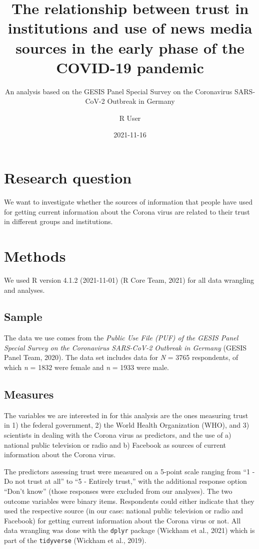 \documentclass[
]{article}
\title{The relationship between trust in institutions and use of news
media sources in the early phase of the COVID-19 pandemic}
\subtitle{An analysis based on the GESIS Panel Special Survey on the
Coronavirus SARS-CoV-2 Outbreak in Germany}
\author{R User}
\date{2021-11-16}
\begin{document}
\maketitle

\hypertarget{research-question}{%
\section{Research question}\label{research-question}}

We want to investigate whether the sources of information that people
have used for getting current information about the Corona virus are
related to their trust in different groups and institutions.

\hypertarget{methods}{%
\section{Methods}\label{methods}}

We used R version 4.1.2 (2021-11-01) (R Core Team, 2021) for all data
wrangling and analyses.

\hypertarget{sample}{%
\subsection{Sample}\label{sample}}

The data we use comes from the \emph{Public Use File (PUF) of the GESIS
Panel Special Survey on the Coronavirus SARS-CoV-2 Outbreak in Germany}
(GESIS Panel Team, 2020). The data set includes data for \emph{N} = 3765
respondents, of which \emph{n} = 1832 were female and \emph{n} = 1933
were male.

\hypertarget{measures}{%
\subsection{Measures}\label{measures}}

The variables we are interested in for this analysis are the ones
measuring trust in 1) the federal government, 2) the World Health
Organization (WHO), and 3) scientists in dealing with the Corona virus
as predictors, and the use of a) national public television or radio and
b) Facebook as sources of current information about the Corona virus.

The predictors assessing trust were measured on a 5-point scale ranging
from ``1 - Do not trust at all'' to ``5 - Entirely trust,'' with the
additional response option ``Don't know'' (those responses were excluded
from our analyses). The two outcome variables were binary items.
Respondents could either indicate that they used the respective source
(in our case: national public television or radio and Facebook) for
getting current information about the Corona virus or not. All data
wrangling was done with the \texttt{dplyr} package (Wickham et al.,
2021) which is part of the \texttt{tidyverse} (Wickham et al., 2019).
\end{document}
